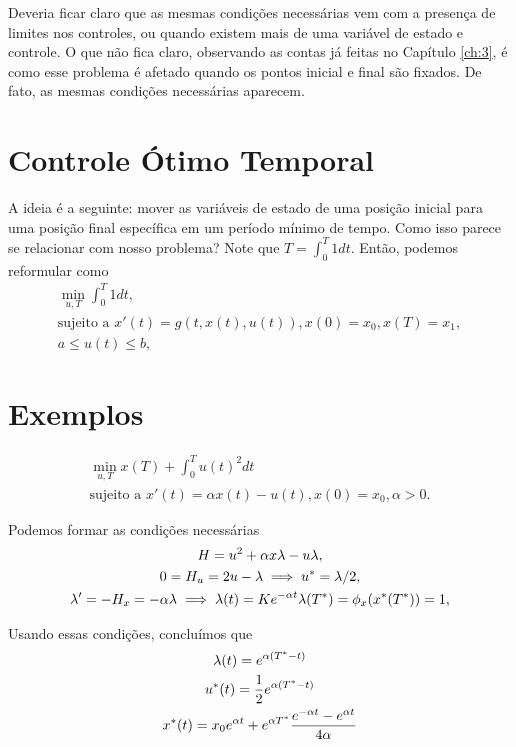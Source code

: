 Deveria ficar claro que as mesmas condições necessárias vem com a presença de
limites nos controles, ou quando existem mais de uma variável de estado e
controle. O que não fica claro, observando as contas já feitas no Capítulo
\ref{ch:3}, é como esse problema é afetado quando os pontos inicial e final
são fixados. De fato, as mesmas condições necessárias aparecem. 

\section{Controle Ótimo Temporal}

A ideia é a seguinte: mover as variáveis de estado de uma posição inicial para
uma posição final específica em um período mínimo de tempo. Como isso parece
se relacionar com nosso problema? Note que $T = \int_0^T 1 dt$. Então, podemos
reformular como 
\begin{gather*}
    \min_{u,T} \int_0^T 1 dt, \\ 
    \text{sujeito a   }x'(t) = g(t, x(t), u(t)), x(0) = x_0, x(T) = x_1, \\
    a \le u(t) \le b, 
\end{gather*}

\section{Exemplos}

\begin{example}
    \begin{gather*}
        \min_{u,T} x(T) + \int_0^T u(t)^2 dt \\
        \text{sujeito a   }x'(t) = \alpha x(t) -u(t), x(0) = x_0, \alpha > 0.
    \end{gather*}
\end{example}

Podemos formar as condições necessárias 
\begin{gather*}
    H = u^2 + \alpha x \lambda - u \lambda, \\
    0 = H_u = 2u - \lambda \implies u^* = \lambda/2, \\
    \lambda ' = -H_x = -\alpha \lambda \implies \lambda(t) = Ke^{-\alpha t}
    \lambda(T^*) = \phi_x(x^*(T^*)) = 1, 
\end{gather*}

Usando essas condições, concluímos que 
\begin{gather*}
    \lambda(t) = e^{\alpha(T^* - t)} \\
    u^*(t) = \frac{1}{2}e^{\alpha(T^* - t)} \\
    x^*(t) = x_0e^{\alpha t} + e^{\alpha T^*}\frac{e^{-\alpha t} - e^{\alpha t}}{4\alpha}
\end{gather*}

